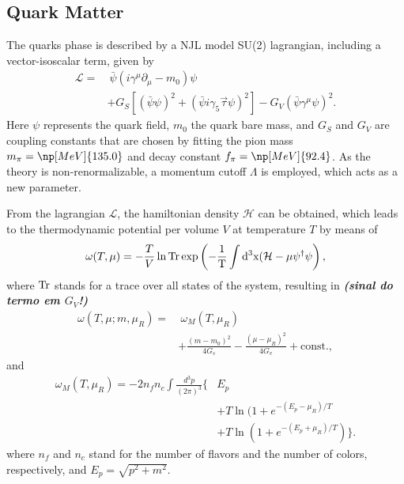 \documentclass[prc, reprint, amsmath, linenumbers,10pt]{revtex4-1}
\newcommand{\tr}{\rm{Tr}}
\newcommand{\comment}[1]{{\bf\textit{#1}}}
\begin{document}
\subsection{Quark Matter}

The quarks phase is described by a NJL model SU(2) lagrangian, including a vector-isoscalar term, given by\cite{Buballa2005}
\begin{equation}\label{Eq:LagNJL-SU2-Bub}
\begin{split}
	\mathcal{L} =&~ \bar{\psi}(i\gamma^\mu\partial_\mu - m_0)\psi \\
	&+ G_S[(\bar{\psi}\psi)^2 + (\bar{\psi}i\gamma_5\vec{\tau}\psi)^2] - G_V(\bar{\psi}\gamma^\mu \psi)^2.
\end{split}
\end{equation}
%
Here $\psi$ represents the quark field, $m_0$ the quark bare mass, and $G_S$ and $G_V$ are coupling constants that are chosen by fitting the pion mass $m_\pi = \np[MeV]{135.0}$ and decay constant $f_\pi = \np[MeV]{92.4}$. As the theory is non-renormalizable, a momentum cutoff $\Lambda$ is employed, which acts as a new parameter.

From the lagrangian $\mathcal{L}$, the hamiltonian density $\mathcal{H}$ can be obtained, which leads to the thermodynamic potential per volume $V$ at temperature $T$ by means of
\begin{equation}
	\omega(T, \mu) = -\frac{T}{V} \ln \tr \exp\left(-\frac{1}{T}\int d^3x(\mathcal{H} - \mu\psi^\dagger\psi\right),
\end{equation}
%
where $\tr$ stands for a trace over all states of the system, resulting in \comment{(sinal do termo em $G_V$!)}
\begin{equation}\label{Eq:Pot_Termo_Temp_Finita}
\begin{split}
	\omega(T, \mu; m, \mu_R) =&~ \omega_M(T, \mu_R) \\
	&+ \frac{(m - m_0)^2}{4G_s} - \frac{(\mu - \mu_R)^2}{4G_v} +  \textrm{const.},
\end{split}
\end{equation}
and
\begin{equation}
\begin{split}\label{Eq:Por_Termo_Temp_Finita_Fermi_Gas_Contrib}
	\omega_M(T, \mu_R) = -2 n_f n_c \int \frac{d^3p}{(2\pi)^3} \{&E_p \\
	&+ T\ln(1+e^{-(E_p-\mu_R)/T} \\
	&+ T\ln(1 + e^{-(E_p+\mu_R)/T})\}.
\end{split}
\end{equation}
%
where $n_f$ and $n_c$ stand for the number of flavors and the number of colors, respectively, and $E_p = \sqrt{p^2 + m^2}$.
\end{document}

